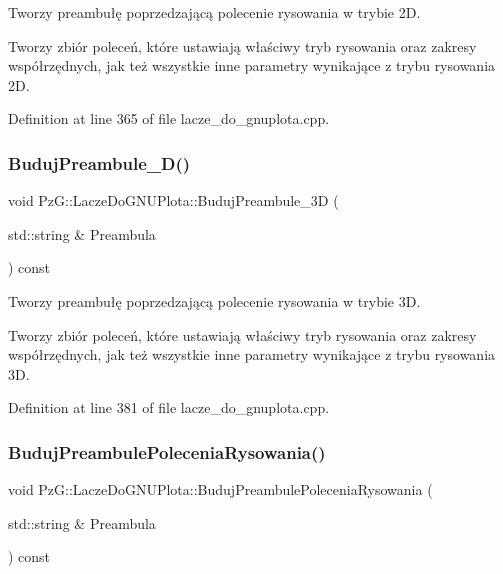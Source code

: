 Tworzy preambułę poprzedzającą polecenie rysowania w trybie 2D. 

Tworzy zbiór poleceń, które ustawiają właściwy tryb rysowania oraz zakresy współrzędnych, jak też wszystkie inne parametry wynikające z trybu rysowania 2D. 

Definition at line 365 of file lacze\+\_\+do\+\_\+gnuplota.\+cpp.

\mbox{\label{class_pz_g_1_1_lacze_do_g_n_u_plota_a50a544677e52829cac4dd4a95b821dcb}} 
\subsubsection{\texorpdfstring{Buduj\+Preambule\+\_\+D()}{BudujPreambule\_3D()}}
{\footnotesize\ttfamily void Pz\+G\+::\+Lacze\+Do\+G\+N\+U\+Plota\+::\+Buduj\+Preambule\+\_\+3D (\begin{DoxyParamCaption}\item[{std\+::string \&}]{Preambula }\end{DoxyParamCaption}) const\hspace{0.3cm}{\ttfamily [protected]}}



Tworzy preambułę poprzedzającą polecenie rysowania w trybie 3D. 

Tworzy zbiór poleceń, które ustawiają właściwy tryb rysowania oraz zakresy współrzędnych, jak też wszystkie inne parametry wynikające z trybu rysowania 3D. 

Definition at line 381 of file lacze\+\_\+do\+\_\+gnuplota.\+cpp.

\mbox{\label{class_pz_g_1_1_lacze_do_g_n_u_plota_a0da98f68f533070d5a32adbdb519cf56}} 
\subsubsection{\texorpdfstring{Buduj\+Preambule\+Polecenia\+Rysowania()}{BudujPreambulePoleceniaRysowania()}}
{\footnotesize\ttfamily void Pz\+G\+::\+Lacze\+Do\+G\+N\+U\+Plota\+::\+Buduj\+Preambule\+Polecenia\+Rysowania (\begin{DoxyParamCaption}\item[{std\+::string \&}]{Preambula }\end{DoxyParamCaption}) const\hspace{0.3cm}{\ttfamily [protected]}}



